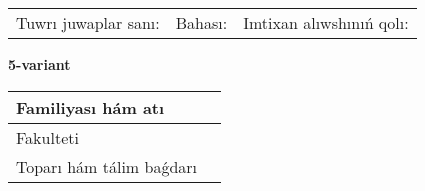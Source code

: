 \documentclass{article}
\begin{document}
\vspace{1cm}

\begin{tabular}{lll}
Tuwrı juwaplar sanı: \underline{\hspace{1.5cm}} & 
Bahası: \underline{\hspace{1.5cm}} & 
Imtixan alıwshınıń qolı: \underline{\hspace{2cm}} \\
\end{tabular}

\egroup

\newpage


\textbf{5-variant}\\

\bgroup
\def\arraystretch{1.6} %

\begin{tabular}{|m{5.7cm}|m{9.5cm}|}
\hline
Familiyası hám atı & \\
\hline
Fakulteti  & \\
\hline
Toparı hám tálim baǵdarı  & \\
\hline
\end{tabular}

\vspace{1cm}
\end{document}
